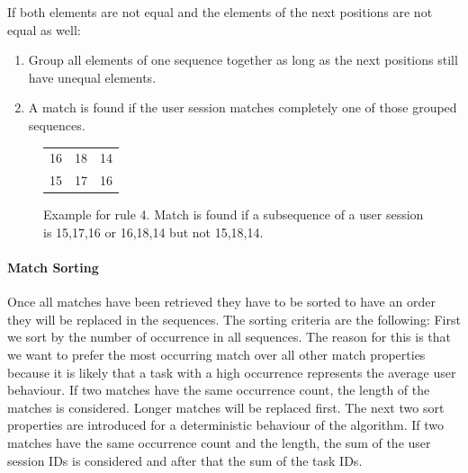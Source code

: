 	\begin{rules}
	\item If both elements are not equal and the elements of the next positions are not equal as well:
		\begin{enumerate}
			\item Group all elements of one sequence together as long as the next positions still have unequal elements.
			\item A match is found if the user session matches completely one of those grouped sequences.
		\end{enumerate}
	\end{rules}
	\begin{figure}[h]
	\centering
	\begin{tabular}{ccc}
		 16 & 18 & 14 \\
		 15 & 17 & 16 \\
	\end{tabular}
	\caption{Example for rule 4. Match is found if a subsequence of a user session is 15,17,16 or 16,18,14 but not 15,18,14.}
	\label{fig:rule4}
	\end{figure}

\paragraph{Match Sorting}
Once all matches have been retrieved they have to be sorted to have an order they will be replaced in the sequences. The sorting criteria are the following:
First we sort by the number of occurrence in all sequences.
The reason for this is that we want to prefer the most occurring match over all other match properties because it is likely that a task with a high occurrence represents
the average user behaviour. If two matches have the same occurrence count, the length of the matches is considered. Longer matches will be replaced first.
The next two sort properties are introduced for a deterministic behaviour of the algorithm.
If two matches have the same occurrence count and the length, the sum of the user session IDs is considered and after that the sum of the task IDs.


